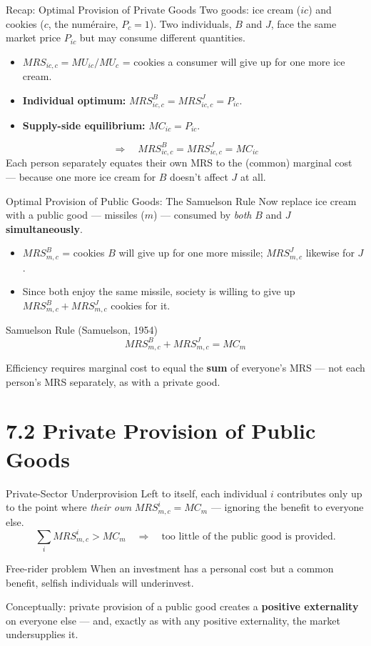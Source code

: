 \documentclass[11pt,aspectratio=169]{beamer}
\begin{document}
\begin{frame}{Recap: Optimal Provision of Private Goods}
  Two goods: ice cream ($ic$) and cookies ($c$, the num\'eraire, $P_c=1$). Two individuals, $B$ and $J$, face the same market price $P_{ic}$ but may consume different quantities.
  \begin{itemize}
    \item $MRS_{ic,c} = MU_{ic}/MU_c$ = cookies a consumer will give up for one more ice cream.
    \item \textbf{Individual optimum:} $MRS^B_{ic,c} = MRS^J_{ic,c} = P_{ic}$.
    \item \textbf{Supply-side equilibrium:} $MC_{ic} = P_{ic}$.
  \end{itemize}
  \[ \Rightarrow \quad MRS^B_{ic,c} = MRS^J_{ic,c} = MC_{ic} \]
  \small Each person separately equates their own MRS to the (common) marginal cost --- because one more ice cream for $B$ doesn't affect $J$ at all.
\end{frame}

\begin{frame}{Optimal Provision of Public Goods: The Samuelson Rule}
  Now replace ice cream with a public good --- missiles ($m$) --- consumed by \emph{both} $B$ and $J$ \textbf{simultaneously}.
  \begin{itemize}
    \item $MRS^B_{m,c}$ = cookies $B$ will give up for one more missile; $MRS^J_{m,c}$ likewise for $J$.
    \item Since both enjoy the same missile, society is willing to give up $MRS^B_{m,c} + MRS^J_{m,c}$ cookies for it.
  \end{itemize}
  \begin{block}{Samuelson Rule (Samuelson, 1954)}
    \[ MRS^B_{m,c} + MRS^J_{m,c} = MC_m \]
  \end{block}
  \small Efficiency requires marginal cost to equal the \textbf{sum} of everyone's MRS --- not each person's MRS separately, as with a private good.
\end{frame}

\section{7.2 Private Provision of Public Goods}

\begin{frame}{Private-Sector Underprovision}
  Left to itself, each individual $i$ contributes only up to the point where \emph{their own} $MRS^i_{m,c} = MC_m$ --- ignoring the benefit to everyone else.
  \[ \sum_i MRS^i_{m,c} > MC_m \quad\Rightarrow\quad \text{too little of the public good is provided.} \]
  \begin{block}{Free-rider problem}
    When an investment has a personal cost but a common benefit, selfish individuals will underinvest.
  \end{block}
  \small Conceptually: private provision of a public good creates a \textbf{positive externality} on everyone else --- and, exactly as with any positive externality, the market undersupplies it.
\end{frame}
\end{document}

